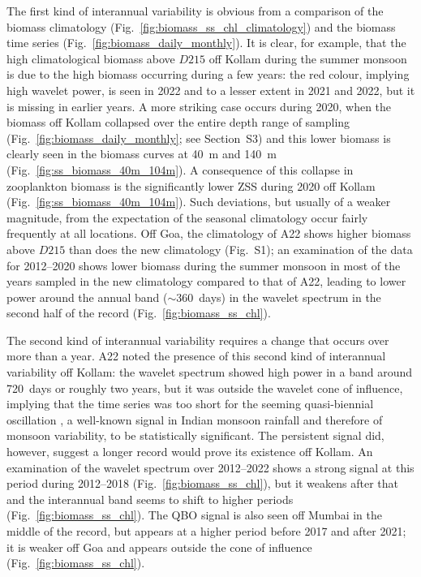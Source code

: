 \documentclass[authoryear,review,11pt]{elsarticle}
\begin{document}
The first kind of interannual variability is obvious from a comparison of the biomass climatology (Fig.~\ref{fig:biomass_ss_chl_climatology}) and the biomass time series (Fig.~\ref{fig:biomass_daily_monthly}).  It is clear, for example, that the high climatological biomass above $D215$ off Kollam during the summer monsoon is due to the high biomass occurring during a few years: the red colour, implying high wavelet power, is seen in 2022 and to a lesser extent in 2021 and 2022, but it is missing in earlier years.  A more striking case occurs during 2020, when the biomass off Kollam collapsed over the entire depth range of sampling (Fig.~\ref{fig:biomass_daily_monthly}; see Section~S3) and this lower biomass is clearly seen in the biomass curves at 40~m and 140~m (Fig.~\ref{fig:ss_biomass_40m_104m}). A consequence of this collapse in zooplankton biomass is the  significantly lower ZSS during 2020 off Kollam (Fig.~\ref{fig:ss_biomass_40m_104m}).  Such deviations, but usually of a weaker magnitude, from the expectation of the seasonal climatology occur fairly frequently at all locations.  Off Goa, the climatology of A22 shows higher biomass above $D215$ than does the new climatology (Fig.~S1); an examination of the data for 2012--2020 shows lower biomass during the summer monsoon in most of the years sampled in the new climatology compared to that of A22, leading to lower power around the annual band ($\sim$360~days) in the wavelet spectrum in the second half of the record (Fig.~\ref{fig:biomass_ss_chl}).

The second kind of interannual variability requires a change that occurs over more than a year. A22 noted the presence of this second kind of interannual variability off Kollam: the wavelet spectrum showed high power in a band around 720~days or roughly two years, but it was outside the wavelet cone of influence, implying that the time series was too short for the seeming quasi-biennial oscillation \citep[QBO;][]{mooley1984fluctuations, bhalme1987tropical}, a well-known signal in Indian monsoon rainfall and therefore of monsoon variability, to be statistically significant.  The persistent signal did, however, suggest a longer record would prove its existence off Kollam.  An examination of the wavelet spectrum over 2012--2022 shows a strong signal at this period during 2012--2018 (Fig.~\ref{fig:biomass_ss_chl}), but it weakens after that and the interannual band seems to shift to higher periods (Fig.~\ref{fig:biomass_ss_chl}).  The QBO signal is also seen off Mumbai in the middle of the record, but appears at a higher period before 2017 and after 2021; it is weaker off Goa and appears outside the cone of influence (Fig.~\ref{fig:biomass_ss_chl}).
\end{document}
